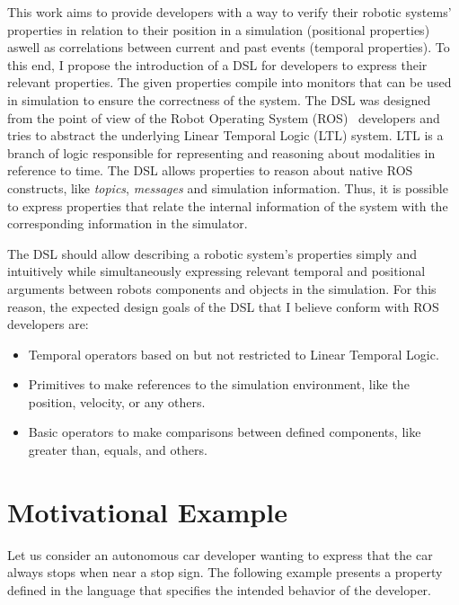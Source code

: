This work aims to provide developers with a way to verify their robotic systems' properties in relation to their position in a simulation (positional properties) aswell as correlations between current and past events (temporal properties). To this end, I propose the introduction of a DSL for developers to express their relevant properties. The given properties compile into monitors that can be used in simulation to ensure the correctness of the system. The DSL was designed from the point of view of the Robot Operating System (ROS)~\cite{quigley2009ros} developers and tries to abstract the underlying Linear Temporal Logic (LTL) system. LTL is a branch of logic responsible for representing and reasoning about modalities in reference to time. The DSL allows properties to reason about native ROS constructs, like \textit{topics}, \textit{messages} and simulation information. Thus, it is possible to express properties that relate the internal information of the system with the corresponding information in the simulator.

The DSL should allow describing a robotic system's properties simply and intuitively while simultaneously expressing relevant temporal and positional arguments between robots components and objects in the simulation. For this reason, the expected design goals of the DSL that I believe conform with ROS developers are:

\begin{itemize}
\item Temporal operators based on but not restricted to Linear Temporal Logic.
\item Primitives to make references to the simulation environment, like the position, velocity, or any others.
\item Basic operators to make comparisons between defined components, like greater than, equals, and others.
\end{itemize}


\section{Motivational Example}
\label{sec:motivationalexample}

Let us consider an autonomous car developer wanting to express that the car always stops when near a stop sign. The following example presents a property defined in the language that specifies the intended behavior of the developer.

